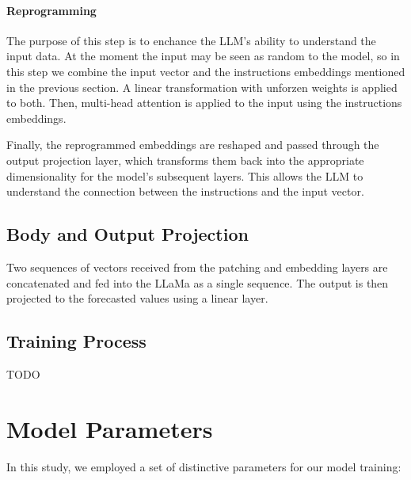 \paragraph{Reprogramming} 
The purpose of this step is to enchance the LLM's ability to understand the input data. At the moment the input may be seen as random to the model, so in this step we combine the input vector and the instructions embeddings mentioned in the previous section. A linear transformation with unforzen weights is applied to both. Then, multi-head attention is applied to the input using the instructions embeddings. 

Finally, the reprogrammed embeddings are reshaped and passed through the output projection layer, which transforms them back into the appropriate dimensionality for the model's subsequent layers. This allows the LLM to understand the connection between the instructions and the input vector. 

\subsection{Body and Output Projection}
Two sequences of vectors received from the patching and embedding layers are concatenated and fed into the LLaMa as a single sequence. The output is then projected to the forecasted values using a linear layer. 


\subsection{Training Process}

TODO

\section{Model Parameters}
In this study, we employed a set of distinctive parameters for our model training:

